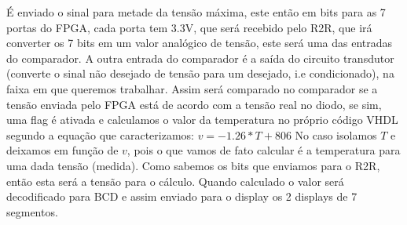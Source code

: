 \documentclass{article}
\begin{document}
É enviado o sinal para metade da tensão máxima, este então em bits para as 7 portas do FPGA, cada porta tem 3.3V, que será recebido pelo R2R, que irá converter os 7 bits em um valor analógico de tensão, este será uma das entradas do comparador. A outra entrada do comparador é a saída do circuito transdutor (converte o sinal não desejado de tensão para um desejado, i.e condicionado), na faixa em que queremos trabalhar. Assim será comparado no comparador se a tensão enviada pelo FPGA está de acordo com a tensão real no diodo, se sim, uma flag é ativada e calculamos o valor da temperatura no próprio código VHDL segundo a equação que caracterizamos: $v = -1.26*T + 806$
No caso isolamos $T$ e deixamos em função de $v$, pois o que vamos de fato calcular é a temperatura para uma dada tensão (medida). Como sabemos os bits que enviamos para o R2R, então esta será a tensão para o cálculo. Quando calculado o valor será decodificado para BCD e assim enviado para o display os 2 displays de 7 segmentos. 
\end{document}
